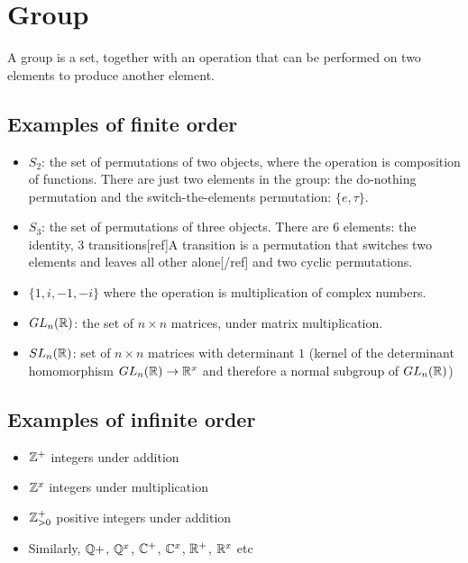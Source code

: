 \newcommand{\alphainv}{\alpha^{-1}}

\section{Group}
A group is a set, together with an operation that can be performed on two
elements to produce another element.

\subsection{Examples of finite order}

\begin{itemize}
\item $S_2$: the set of permutations of two objects, where the operation is
  composition of functions.  There are just two elements in the group: the
  do-nothing permutation and the switch-the-elements permutation: $\{e,
  \tau\}$.

\item $S_3$: the set of permutations of three objects. There are 6 elements: the
  identity, 3 transitions[ref]A transition is a permutation that switches two
  elements and leaves all other alone[/ref] and two cyclic permutations.

\item $\{1, i, -1, -i\}$ where the operation is multiplication of complex numbers.

\item $GL_n(\mathbb{R})$: the set of $n \times n$ matrices, under matrix multiplication.

\item $SL_n(\mathbb{R})$: set of $n \times n$ matrices with determinant $1$ (kernel of the
  determinant homomorphism $GL_n(\mathbb{R}) \rightarrow \mathbb{R}^x$ and therefore a normal
  subgroup of $GL_n(\mathbb{R})$)
\end{itemize}

\subsection{Examples of infinite order}

\begin{itemize}
\item $\mathbb{Z}^+$ integers under addition

\item $\mathbb{Z}^x$ integers under multiplication

\item $\mathbb{Z}_{>0}^+$ positive integers under addition

\item Similarly, $\mathbb{Q}+$, $\mathbb{Q}^x$, $\mathbb{C}^+$, $\mathbb{C}^x$, $\mathbb{R}^+$, $\mathbb{R}^x$ etc

\end{itemize}

